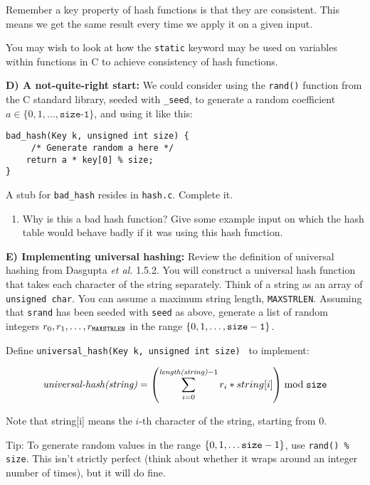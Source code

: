 \documentclass[11pt]{article}
\newcommand{\size}{{\tt size}}
\begin{document}
Remember a key property of hash functions is that they are consistent.
This means we get the same result every time we apply it on a given input.

You may wish to look at how the {\tt static} keyword may be used on variables
within functions in C to achieve consistency of hash functions.

\begin{description}
    \item {\bf D) A not-quite-right start:}
        We could consider using the {\tt rand()} function from the C standard library,
        seeded with {\tt \_seed},
        to generate a random coefficient $a \in \{0, 1, \ldots,
        \texttt{size-1}\}$,
        and using it like this:

\begin{verbatim}
bad_hash(Key k, unsigned int size) {
     /* Generate random a here */
    return a * key[0] % size;
}
\end{verbatim}

        A stub for {\tt bad\_hash} resides in {\tt hash.c}.  Complete it.

\end{description}

\begin{enumerate}[resume]
    \item Why is this a bad hash function?
        Give some example input on which the hash table would behave badly if it was using this hash function.
\end{enumerate}

\begin{description}
    \item {\bf E) Implementing universal hashing: }
        Review the definition of universal hashing from Dasgupta {\it et al.} \/1.5.2.
        You will construct a universal hash function that takes each character of the string separately.
        Think of a string as an array of \texttt{unsigned char}.
        You can assume a maximum string length, {\tt MAXSTRLEN}.
        Assuming that {\tt srand} has been seeded with {\tt seed} as above,
        generate a list of random integers $r_0, r_1, \ldots, r_{{\tt MAXSTRLEN}}$
        in the range $\{0,1,\ldots,{\tt size-1}\}$.

        Define {\tt universal\_hash(Key k, unsigned int size) } to implement:

        $$\textit{universal-hash(string)} = \left( \sum_{i=0}^{ \textit{length(string)}-1} r_i * string[i] \right) \bmod \size $$

        Note that string[i] means the $i$-th character of the string,
        starting from 0.

        Tip: To generate random values in the range $\{0,1, \ldots {\tt size}-1 \}$,
        use {\tt rand() \%  size}.
        This isn't strictly perfect (think about whether it wraps around an integer number of times),
        but it will do fine.
\end{description}
\end{document}
